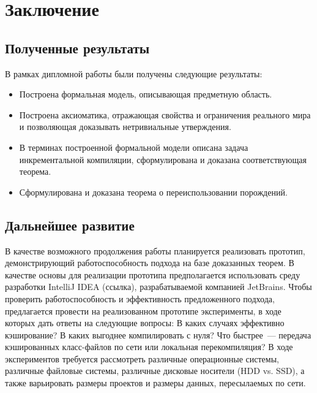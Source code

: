 \section{Заключение}

\subsection{Полученные результаты}

В рамках дипломной работы были получены следующие результаты:

\begin{itemize}

	\item Построена формальная модель, описывающая предметную область.

	\item Построена аксиоматика, отражающая свойства и ограничения реального мира и позволяющая доказывать нетривиальные утверждения.

	\item В терминах построенной формальной модели описана задача инкрементальной компиляции, сформулирована и доказана соответствующая теорема.

	\item Сформулирована и доказана теорема о переиспользовании порождений.

\end{itemize}

\subsection{Дальнейшее развитие}

В качестве возможного продолжения работы планируется реализовать прототип, демонстрирующий работоспособность подхода на базе доказанных теорем. В качестве основы для реализации прототипа предполагается использовать среду разработки IntelliJ IDEA (ссылка), разрабатываемой компанией JetBrains. Чтобы проверить работоспособность и эффективность предложенного подхода, предлагается провести на реализованном прототипе эксперименты, в ходе которых дать ответы на следующие вопросы: В каких случаях эффективно кэширование? В каких выгоднее компилировать с нуля? Что быстрее~--- передача кэшированных класс-файлов по сети или локальная перекомпиляция? В ходе экспериментов требуется рассмотреть различные операционные системы, различные файловые системы, различные дисковые носители (HDD vs. SSD), а также варьировать размеры проектов и размеры данных, пересылаемых по сети.

